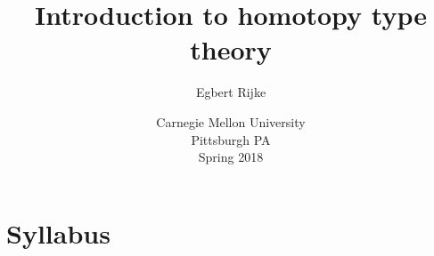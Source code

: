 \documentclass[11pt]{memoir} %
\title{Introduction to homotopy type theory}
\author{Egbert Rijke}
\date{Carnegie Mellon University\\Pittsburgh PA\\Spring 2018}
\begin{document}
\begin{titlingpage}
\maketitle 
\end{titlingpage}

\frontmatter
\tableofcontents



\chapter{Syllabus}

\mainmatter 






















\end{document}
